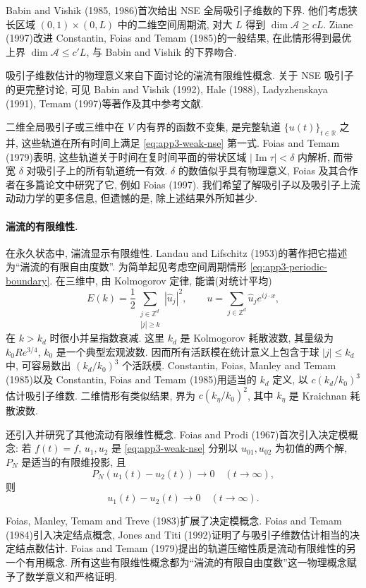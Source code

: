 \hypertarget{appendix-03-page-366}{}
Babin and Vishik (1985, 1986)首次给出 NSE 全局吸引子维数的下界. 他们考虑狭长区域 $(0,1)\times(0,L)$ 中的二维空间周期流, 对大 $L$ 得到 $\dim\mathcal A\geq cL$. Ziane (1997)改进 Constantin, Foias and Temam (1985)的一般结果, 在此情形得到最优上界 $\dim\mathcal A\leq c'L$, 与 Babin and Vishik 的下界吻合.

吸引子维数估计的物理意义来自下面讨论的湍流有限维性概念. 关于 NSE 吸引子的更完整讨论, 可见 Babin and Vishik (1992), Hale (1988), Ladyzhenskaya (1991), Temam (1997)等著作及其中参考文献.

二维全局吸引子或三维中在 $V$ 内有界的函数不变集, 是完整轨道 $\{u(t)\}_{t\in\mathbb R}$ 之并, 这些轨道在所有时间上满足 
\eqref{eq:app3-weak-nse} 第一式. Foias and Temam (1979)表明, 这些轨道关于时间在复时间平面的带状区域 $|\operatorname{Im}\tau|<\delta$ 内解析, 而带宽 $\delta$ 对吸引子上的所有轨道统一有效. $\delta$ 的数值似乎具有物理意义, Foias 及其合作者在多篇论文中研究了它, 例如 Foias (1997). 我们希望了解吸引子以及吸引子上流动动力学的更多信息, 但遗憾的是, 除上述结果外所知甚少.

\paragraph{湍流的有限维性.}
在永久状态中, 湍流显示有限维性. Landau and Lifschitz (1953)的著作把它描述为``湍流的有限自由度数''. 为简单起见考虑空间周期情形 
\eqref{eq:app3-periodic-boundary}. 在三维中, 由 Kolmogorov 定律, 能谱(对统计平均)
\[
E(k)=\frac12\sum_{\substack{j\in\mathbb Z^d\\|j|\geq k}}|\widehat u_j|^2,
\qquad
u=\sum_{j\in\mathbb Z^d}\widehat u_je^{ij\cdot x},
\]
在 $k>k_d$ 时很小并呈指数衰减. 这里 $k_d$ 是 Kolmogorov 耗散波数, 其量级为 $k_0Re^{3/4}$, $k_0$ 是一个典型宏观波数. 因而所有活跃模在统计意义上包含于球 $|j|\leq k_d$ 中, 可容易数出 $(k_d/k_0)^3$ 个活跃模. Constantin, Foias, Manley and Temam (1985)以及 Constantin, Foias and Temam (1985)用适当的 $k_d$ 定义, 以 $c(k_d/k_0)^3$ 估计吸引子维数. 二维情形有类似结果, 界为 $c(k_\eta/k_0)^2$, 其中 $k_\eta$ 是 Kraichnan 耗散波数.

还引入并研究了其他流动有限维性概念. Foias and Prodi (1967)首次引入决定模概念: 若 $f(t)=f$, $u_1,u_2$ 是 
\eqref{eq:app3-weak-nse} 分别以 $u_{01},u_{02}$ 为初值的两个解, $P_N$ 是适当的有限维投影, 且
\[
P_N(u_1(t)-u_2(t))\to0\quad(t\to\infty),
\]
则
\[
u_1(t)-u_2(t)\to0\quad(t\to\infty).
\]

\hypertarget{appendix-03-page-367}{}
Foias, Manley, Temam and Treve (1983)扩展了决定模概念. Foias and Temam (1984)引入决定结点概念, Jones and Titi (1992)证明了与吸引子维数估计相当的决定结点数估计. Foias and Temam (1979)提出的轨道压缩性质是流动有限维性的另一个有用概念. 所有这些有限维性概念都为``湍流的有限自由度数''这一物理概念赋予了数学意义和严格证明.

